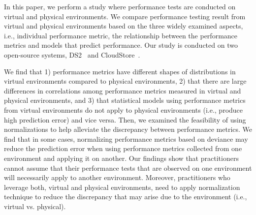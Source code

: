 


In this paper, we perform a study where performance tests are conducted on virtual and physical environments. We compare performance testing result from virtual and physical environments based on the three widely examined aspects, i.e., individual performance metric, the relationship between the performance metrics and models that predict performance. Our study is conducted on two open-source systems, DS2~\cite{delldvd} and CloudStore~\cite{cloudstore}. 


We find that 1) performance metrics have different shapes of distributions in virtual environments compared to physical environments, 2) that there are large differences in correlations among performance metrics measured in virtual and physical environments, and 3) that statistical models using performance metrics from virtual environments do not apply to physical environments (i.e., produce high prediction error) and vice versa. Then, we examined the feasibility of using normalizations to help alleviate the discrepancy between performance metrics. We find that in some cases, normalizing performance metrics based on deviance may reduce the prediction error when using performance metrics collected from one environment and applying it on another. Our findings show that practitioners cannot assume that their performance tests that are observed on one environment will necessarily apply to another environment. Moreover, practitioners who leverage both, virtual and physical environments, need to apply normalization technique to reduce the discrepancy that may arise due to the environment (i.e., virtual vs. physical). 

